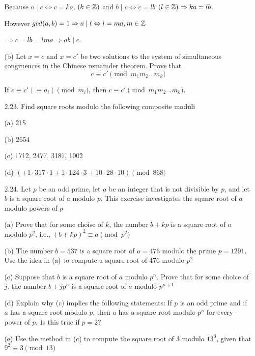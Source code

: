 Because $a \mid c \Leftrightarrow c=ka$, $(k \in \mathbb{Z})$ and $b \mid c \Leftrightarrow c=lb$ $(l \in \mathbb{Z}) \Rightarrow ka = lb$. 

However $gcd(a,b) = 1 \Rightarrow a \mid l \Leftrightarrow l = ma, m \in \mathbb{Z}$

$\Rightarrow c=lb=lma  \Rightarrow ab \mid c$.

(b) Let $x=c$ and $x=c'$ be two solutions to the system of simultaneous congruences in the Chinese remainder theorem. Prove that
\begin{equation*}
    c \equiv c' \pmod{m_1m_2...m_k}
\end{equation*}

If $c \equiv c' (\equiv a_i) \pmod m_i$, then $c \equiv c' \pmod{m_1m_2...m_k}$.

2.23. Find square roots modulo the following composite moduli

(a) 215

(b) 2654

(c) 1712, 2477, 3187, 1002

(d) $(\pm 1 \cdot 317 \cdot 1 \pm 1 \cdot 124 \cdot 3 \pm 10 \cdot 28 \cdot 10) \pmod{868}$


2.24. Let $p$ be an odd prime, let $a$ be an integer that is not divisible by $p$, and let $b$ is a square root of $a$ modulo $p$. This exercise investigates the square root of $a$ modulo powers of $p$

(a) Prove that for some choise of $k$, the number $b+kp$ is a square root of $a$ modulo $p^2$, i.e., $(b+kp)^2 \equiv a \pmod{p^2}$

(b) The number $b=537$ is a square root of $a=476$ modulo the prime $p=1291$. Use the idea in (a) to compute a square root of 476 modulo $p^2$

(c) Suppose that $b$ is a square root of $a$ modulo $p^n$. Prove that for some choice of $j$, the number $b+jp^n$ is a square root of $a$ modulo $p^{n+1}$

(d) Explain why (c) implies the following statements: If $p$ is an odd prime and if $a$ has a square root modulo $p$, then $a$ has a square root modulo $p^n$ for every power of $p$. Is this true if $p=2$?

(e) Use the method in (c) to compute the square root of 3 modulo $13^3$, given that $9^2\equiv 3 \pmod{13}$


